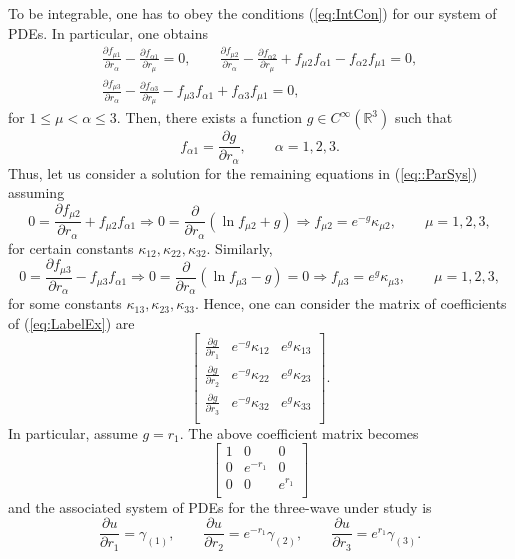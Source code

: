 \documentclass[12pt]{article}
\theoremstyle{plain}
\theoremstyle{definition}
\numberwithin{equation}{section}
\begin{document}
To be integrable, one has to obey the conditions (\ref{eq:IntCon}) for our system of PDEs. 
In particular,
one obtains
\begin{equation}\label{eq::ParSys}
    \begin{gathered}
\frac{\partial f_{\mu1}}{\partial r_\alpha}-\frac{\partial f_{\alpha 1}}{\partial r_\mu}=0,\qquad \frac{\partial f_{\mu2}}{\partial r_\alpha}-\frac{\partial f_{\alpha 2}}{\partial r_\mu}+f_{\mu2}f_{\alpha1}-f_{\alpha2}f_{\mu1}=0,\\
\frac{\partial f_{\mu3}}{\partial r_\alpha}-\frac{\partial f_{\alpha 3}}{\partial r_\mu}-f_{\mu3}f_{\alpha1}+f_{\alpha3}f_{\mu1}=0,
\end{gathered}
\end{equation}
for $1\leq \mu<\alpha\leq 3$. Then, there exists a function $g\in C^\infty(\mathbb{R}^3)$ such that
$$
f_{\alpha1}=\frac{\partial g}{\partial r_\alpha},\qquad \alpha=1,2,3.
$$
Thus, let us consider a solution for the remaining equations in (\ref{eq::ParSys}) assuming
$$
0=\frac{\partial f_{\mu2}}{\partial r_\alpha}+f_{\mu2}f_{\alpha 1}\Rightarrow 0=\frac{\partial}{\partial r_\alpha}(\ln f_{\mu2}+g)\Rightarrow f_{\mu2}=e^{-g}\kappa_{\mu2}, \qquad \mu=1,2,3,
$$
for certain constants $\kappa_{12},\kappa_{22},\kappa_{32}$. Similarly, 
$$
0=\frac{\partial f_{\mu3}}{\partial r_\alpha}-f_{\mu3}f_{\alpha 1}\Rightarrow 0= \frac{\partial}{\partial r_\alpha}(\ln f_{\mu3}-g)=0\Rightarrow f_{\mu3}=e^{g}\kappa_{\mu3},\qquad \mu=1,2,3,
$$
for some constants $\kappa_{13},\kappa_{23},\kappa_{33}$. Hence,
one can consider the matrix of coefficients of (\ref{eq:LabelEx}) are
$$
\left[\begin{array}{ccc}\frac{\partial g}{\partial r_1}&e^{-g}\kappa_{12}&e^{g}\kappa_{13}\\
\frac{\partial g}{\partial r_2}&e^{-g}\kappa_{22}&e^{g}\kappa_{23}\\
\frac{\partial g}{\partial r_3}&e^{-g}\kappa_{32}&e^{g}\kappa_{33}\\\end{array}\right].
$$
In particular, assume $g=r_1$. The above coefficient matrix becomes
$$
\left[\begin{array}{ccc}1&0&0\\
0&e^{-r_1}&0\\
0&0&e^{r_1}\\\end{array}\right]
$$
and the associated system of PDEs for the three-wave under study is
\begin{equation}\label{eq:SystemRec}
\frac{\partial u}{\partial r_1}=\gamma_{(1)},\qquad \frac{\partial u}{\partial r_2}=e^{-r_1}\gamma_{(2)},\qquad \frac{\partial u}{\partial r_3}=e^{r_1}\gamma_{(3)}.
\end{equation}
\end{document}
